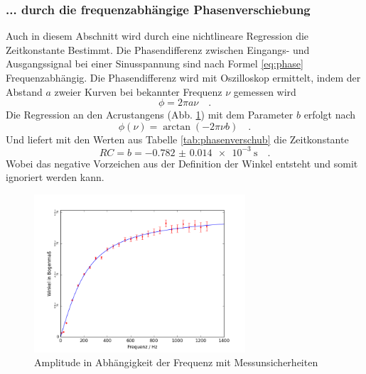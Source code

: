 \subsubsection{... durch die frequenzabhängige Phasenverschiebung}
Auch in diesem Abschnitt wird durch eine nichtlineare Regression die Zeitkonstante Bestimmt. Die Phasendifferenz zwischen Eingangs- und Ausgangssignal bei einer Sinusspannung sind nach Formel \eqref{eq:phase} Frequenzabhängig. Die Phasendifferenz wird mit Oszilloskop ermittelt, indem der Abstand $a$ zweier Kurven bei bekannter Frequenz $\nu$ gemessen wird
\begin{equation}
\phi = 2 \pi a \nu \quad .
\end{equation}
Die Regression an den Acrustangens (Abb. \ref{fig:phasenverschub}) mit dem Parameter $b$ erfolgt nach
\begin{equation}
\phi (\nu) = \arctan(-2\pi \nu b) \quad .
\end{equation}
Und liefert mit den Werten aus Tabelle \ref{tab:phasenverschub} die Zeitkonstante
\begin{equation}
RC = b = \SI{-0.782(14)e-3}{\second} \quad.
\end{equation}
Wobei das negative Vorzeichen aus der Definition der Winkel entsteht und somit ignoriert werden kann.

\begin{figure}[h!]
	\centering
	\includegraphics[width=0.7\textwidth]{Phasenverschub1.png}
	\caption{Amplitude in Abhängigkeit der Frequenz mit Messunsicherheiten}
	\label{fig:phasenverschub}
\end{figure} 


